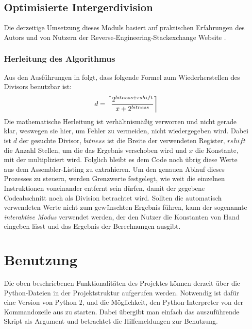 \documentclass[11pt]{article}
\DeclarePairedDelimiter\ceil{\lceil}{\rceil}
\begin{document}
\subsection{Optimisierte Intergerdivision} Die derzeitige Umsetzung dieses Moduls basiert auf
praktischen Erfahrungen des Autors und von Nutzern der Reverse-Engineering-Stackexchange
Website \cite{stackexchange:4}.

\subsubsection{Herleitung des Algorithmus}
Aus den Ausführungen in \cite{stackexchange:4} folgt, dass folgende Formel zum Wiederherstellen
des Divisors benutzbar ist:
\begin{equation*}
	d = \ceil*{\frac{2^{bitness + rshift}}{x + 2^{bitness}}}
\end{equation*}
Die mathematische Herleitung ist verhältnismäßig verworren und nicht gerade klar, weswegen sie hier,
um Fehler zu vermeiden, nicht wiedergegeben wird. Dabei ist $d$ der gesuchte Divisor, $bitness$ ist
die Breite der verwendeten Register, $rshift$ die Anzahl Stellen, um die das Ergebnis verschoben wird
und $x$ die Konstante, mit der multipliziert wird.
Folglich bleibt es dem Code noch übrig diese Werte aus dem Assembler-Listing zu extrahieren. Um den
genauen Ablauf dieses Prozesses zu steuern, werden Grenzwerte festgelegt, wie weit die einzelnen
Instruktionen voneinander entfernt sein dürfen, damit der gegebene Codeabschnitt noch als Division
betrachtet wird. Sollten die automatisch verwendeten Werte nicht zum gewünschten Ergebnis führen,
kann der sogenannte \textit{interaktive Modus} verwendet werden, der den Nutzer die Konstanten von
Hand eingeben lässt und das Ergebnis der Berechnungen ausgibt. 

\section{Benutzung}
Die oben beschriebenen Funktionalitäten des Projektes können derzeit über die Python-Dateien in der
Projektstruktur aufgerufen werden. Notwendig ist dafür eine Version von Python 2, und die Möglichkeit,
den Python-Interpreter von der Kommandozeile aus zu starten. Dabei übergibt man einfach das auszuführende
Skript als Argument und betrachtet die Hilfemeldungen zur Benutzung.
\end{document}

